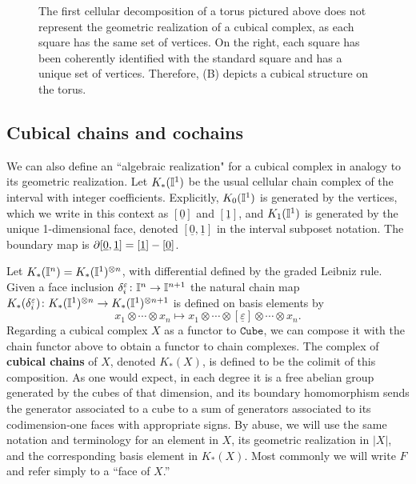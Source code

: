 \begin{figure}
	
	\caption{The first cellular decomposition of a torus pictured above does not represent the geometric realization of a cubical complex, as each square has the same set of vertices.
		On the right, each square has been coherently identified with the standard square and has a unique set of vertices.
		Therefore, (B) depicts a cubical structure on the torus.}
	\label{F: cubical structure}
\end{figure}

\subsection{Cubical chains and cochains}\label{S: cubical cochains}

We can also define an ``algebraic realization" for a cubical complex in analogy to its geometric realization.
Let $K_*(\mathbb{I}^1)$ be the usual cellular chain complex of the interval with integer coefficients.
Explicitly, $K_0(\mathbb{I}^1)$ is generated by the vertices, which we write in this context as $[\underline{0}]$ and $[\underline{1}]$, and $K_1(\mathbb{I}^1)$ is generated by the unique 1-dimensional face, denoted $[\underline{0},\underline{1}]$ in the interval subposet notation.
The boundary map is $\partial [\underline{0},\underline{1}] = [\underline{1}]-[\underline{0}]$.

Let $K_*(\mathbb{I}^n) = K_*(\mathbb{I}^1)^{ \otimes n}$, with differential defined by the graded Leibniz rule.
Given a face inclusion $\delta_i^{\varepsilon} \colon \mathbb{I}^n \to \mathbb{I}^{n+1}$ the natural chain map $K_*(\delta_i^{\varepsilon}) \colon K_*(\mathbb{I}^1)^{ \otimes n} \to K_*(\mathbb{I}^1)^{ \otimes n+1}$ is defined on basis elements by
\begin{equation*}
	x_1 \otimes \cdots \otimes x_n \mapsto
	x_1 \otimes \cdots \otimes [\underline{\varepsilon}] \otimes \cdots \otimes x_n.
\end{equation*}
Regarding a cubical complex $X$ as a functor to $\mathtt{Cube}$, we can compose it with the chain functor above to obtain a functor to chain complexes.
The complex of \textbf{cubical chains} of $X$, denoted $K_*(X)$, is defined to be the colimit of this composition.
As one would expect, in each degree it is a free abelian group generated by the cubes of that dimension, and its boundary homomorphism sends the
generator associated to a cube to a sum of generators associated to its codimension-one faces with appropriate signs.
By abuse, we will use the same notation and terminology for an element in $X$, its geometric realization in $|X|$,
and the corresponding basis element in $K_*(X)$.
Most commonly we will write $F$ and refer simply to a ``face of $X$.''

